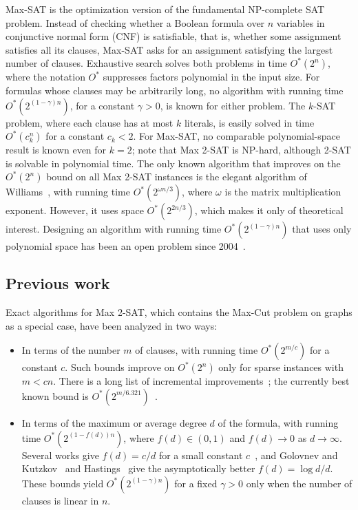 \documentclass[11pt,a4paper]{article}
\theoremstyle{definition}
\theoremstyle{remark}
\newcommand{\Ostar}{O^{*}}
\begin{document}
Max-SAT is the optimization version of the fundamental NP-complete SAT problem. Instead of checking whether a Boolean formula over $n$ variables in conjunctive normal form (CNF) is satisfiable, that is, whether some assignment satisfies all its clauses, Max-SAT asks for an assignment satisfying the largest number of
clauses. Exhaustive search solves both problems in time $\Ostar(2^n)$, where the notation $\Ostar$ suppresses factors polynomial in the input size. For formulas whose clauses may be arbitrarily long, no algorithm with running time $\Ostar(2^{(1-\gamma)n})$, for a constant $\gamma>0$, is known for either problem. The $k$-SAT problem, where each clause has at most $k$ literals, is easily solved in time $\Ostar(c_k^n)$ for a constant $c_k<2$. For Max-SAT, no comparable polynomial-space result is known even for $k=2$; note that Max 2-SAT is NP-hard, although 2-SAT is solvable in polynomial time. The only known algorithm that improves on the $\Ostar(2^n)$ bound on all Max 2-SAT instances is the elegant algorithm of Williams~\cite{Williams}, with running time $\Ostar(2^{\omega n/3})$, where $\omega$
is the matrix multiplication exponent. However, it uses space $\Ostar(2^{2n/3})$, which makes it only of theoretical interest. Designing an algorithm with running time $\Ostar(2^{(1-\gamma)n})$ that uses only polynomial space has been an open problem since 2004~\cite{Williams,WOEGINGER}.

\subsection{Previous work}\label{sec:previous}

Exact algorithms for Max 2-SAT, which contains the Max-Cut problem on graphs as a special case, have been analyzed in two ways:
\begin{itemize}
	\item In terms of the number $m$ of clauses, with running time $\Ostar(2^{m/c})$ for a constant $c$. Such bounds improve on $\Ostar(2^n)$ only for sparse instances with $m<cn$. There is a long list of incremental improvements~\cite{SS07,KulikovK07,EdwardsM15,GaspersS17}; the currently best known bound is $\Ostar(2^{m/6.321})$~\cite{GaspersS12}.
	\item In terms of the maximum or average degree $d$ of the formula, with running time $\Ostar(2^{(1-f(d))n})$, where $f(d)\in(0,1)$ and $f(d)\to0$ as $d\to\infty$. Several works give $f(d) = c/d$ for a small constant $c$~\cite{SS07,Marcin07,best_sparse_maxsat}, and Golovnev and Kutzkov~\cite{GK14} and Hastings~\cite{Hastings} give the asymptotically better $f(d) = \log d/d$. These bounds yield $\Ostar(2^{(1-\gamma)n})$ for a fixed $\gamma >0$ only when the number of clauses is linear in $n$.
\end{itemize}
\end{document}
